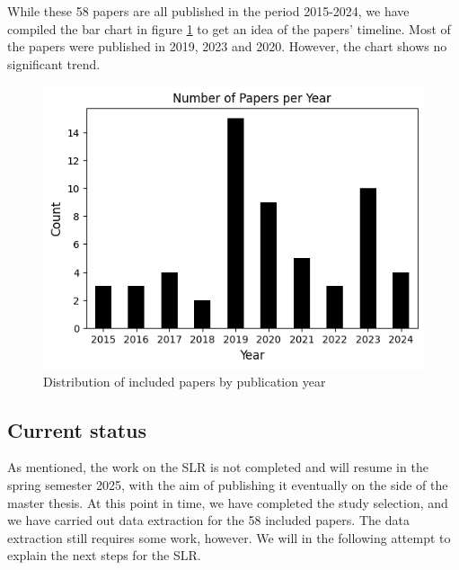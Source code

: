 While these 58 papers are all published in the period 2015-2024, we have compiled the bar chart in figure \ref{fig:papersbyyear} to get an idea of the papers' timeline. Most of the papers were published in 2019, 2023 and 2020. However, the chart shows no significant trend.

\begin{figure}[h!]
    \centering
    \includegraphics[width=\linewidth]{figures/papers-by-year.png}
    \caption{Distribution of included papers by publication year}
    \label{fig:papersbyyear}
\end{figure}

\subsection{Current status}
As mentioned, the work on the SLR is not completed and will resume in the spring semester 2025, with the aim of publishing it eventually on the side of the master thesis. At this point in time, we have completed the study selection, and we have carried out data extraction for the 58 included papers. The data extraction still requires some work, however. We will in the following attempt to explain the next steps for the SLR.

